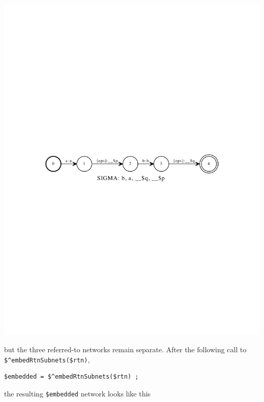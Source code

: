 \begin{center}
\includegraphics[width=\textwidth]{images/twoReferences.pdf}
\end{center}

\noindent
but the three referred-to networks remain separate.  After the following
call to \verb!$^embedRtnSubnets($rtn)!, 

\begin{Verbatim}[fontsize=\small]
$embedded = $^embedRtnSubnets($rtn) ;
\end{Verbatim}


\noindent
the resulting \verb!$embedded! network looks like this


